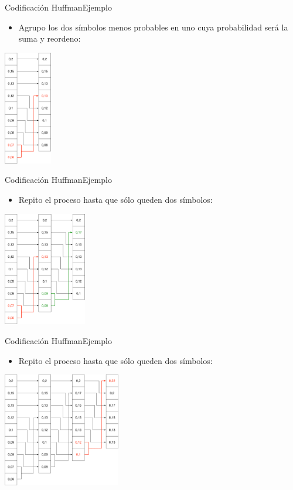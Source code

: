 \documentclass[10pt,compress]{beamer} %
\begin{document}
\begin{frame}{Codificación Huffman}{Ejemplo}
  \begin{itemize}
    \item Agrupo los dos símbolos menos probables en uno cuya probabilidad será la suma y reordeno:
  \end{itemize}
  \centering \includegraphics[height=5cm]{./Figuras/Huffman1.pdf}
\end{frame}

\begin{frame}{Codificación Huffman}{Ejemplo}
  \begin{itemize}
    \item Repito el proceso hasta que sólo queden dos símbolos:
  \end{itemize}
  \centering \includegraphics[height=5cm]{./Figuras/Huffman2.pdf}
\end{frame}

\begin{frame}{Codificación Huffman}{Ejemplo}
  \begin{itemize}
    \item Repito el proceso hasta que sólo queden dos símbolos:
  \end{itemize}
  \centering \includegraphics[height=5cm]{./Figuras/Huffman3.pdf}
\end{frame}
\end{document}
